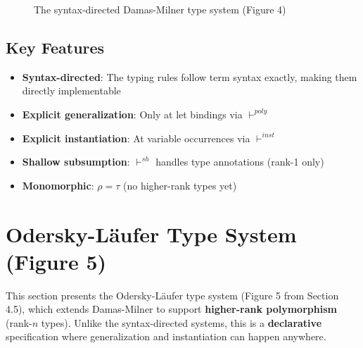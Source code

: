 \documentclass[11pt,a4paper]{article}
\begin{document}
\begin{figure}[htbp]
{\begin{minipage}{0.95\textwidth}
\begin{minipage}[t]{0.45\textwidth}
\bigskip

\begin{mathpar}
\end{mathpar}
\end{minipage}

\bigskip


\bigskip


\bigskip
\end{minipage}%
}
\caption{The syntax-directed Damas-Milner type system (Figure 4)}
\label{fig:damas-milner}
\end{figure}

\subsection{Key Features}

\begin{itemize}
\item \textbf{Syntax-directed}: The typing rules follow term syntax exactly, making them directly implementable
\item \textbf{Explicit generalization}: Only at \textsf{let} bindings via $\vdash^{poly}$
\item \textbf{Explicit instantiation}: At variable occurrences via $\vdash^{inst}$
\item \textbf{Shallow subsumption}: $\vdash^{sh}$ handles type annotations (rank-1 only)
\item \textbf{Monomorphic}: $\rho = \tau$ (no higher-rank types yet)
\end{itemize}

\section{Odersky-Läufer Type System (Figure 5)}

This section presents the Odersky-Läufer type system (Figure 5 from Section 4.5), which extends Damas-Milner to support \textbf{higher-rank polymorphism} (rank-$n$ types). Unlike the syntax-directed systems, this is a \textbf{declarative} specification where generalization and instantiation can happen anywhere.
\end{document}
